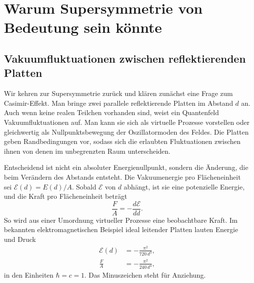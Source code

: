 \chapter{Warum Supersymmetrie von Bedeutung sein könnte}


\section{Vakuumfluktuationen zwischen reflektierenden Platten}

Wir kehren zur Supersymmetrie zurück und klären zunächst eine Frage zum Casimir-Effekt. Man bringe zwei parallele reflektierende Platten im Abstand \(d\) an. Auch wenn keine realen Teilchen vorhanden sind, weist ein Quantenfeld Vakuumfluktuationen auf. Man kann sie sich als virtuelle Prozesse vorstellen oder gleichwertig als Nullpunktsbewegung der Oszillatormoden des Feldes. Die Platten geben Randbedingungen vor, sodass sich die erlaubten Fluktuationen zwischen ihnen von denen im unbegrenzten Raum unterscheiden.

Entscheidend ist nicht ein absoluter Energienullpunkt, sondern die Änderung, die beim Verändern des Abstands entsteht. Die Vakuumenergie pro Flächeneinheit sei \(\mathcal E(d)=E(d)/A\). Sobald \(\mathcal E\) von \(d\) abhängt, ist sie eine potenzielle Energie, und die Kraft pro Flächeneinheit beträgt
\begin{equation}
\frac{F}{A}=-\frac{d\mathcal E}{dd}.
\end{equation}
So wird aus einer Umordnung virtueller Prozesse eine beobachtbare Kraft. Im bekannten elektromagnetischen Beispiel ideal leitender Platten lauten Energie und Druck
\begin{align}
\mathcal E(d)&=-\frac{\pi^2}{720\,d^3},\\
\frac{F}{A}&=-\frac{\pi^2}{240\,d^4},
\end{align}
in den Einheiten \(\hbar=c=1\). Das Minuszeichen steht für Anziehung.

